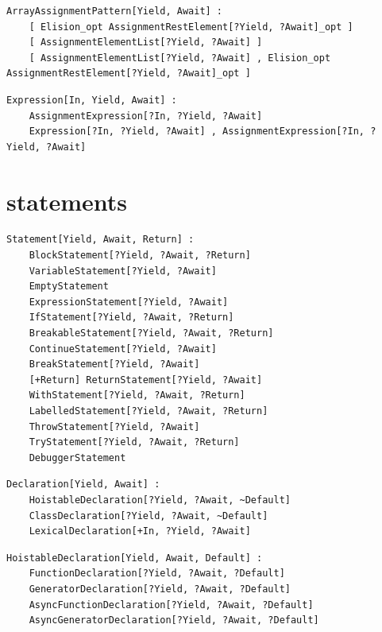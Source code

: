 \noindent\textbf{\texttt{}}\par
\begin{lstlisting}
ArrayAssignmentPattern[Yield, Await] :
    [ Elision_opt AssignmentRestElement[?Yield, ?Await]_opt ]
    [ AssignmentElementList[?Yield, ?Await] ]
    [ AssignmentElementList[?Yield, ?Await] , Elision_opt AssignmentRestElement[?Yield, ?Await]_opt ]
\end{lstlisting}

\noindent\textbf{\texttt{}}\par
\begin{lstlisting}
Expression[In, Yield, Await] :
    AssignmentExpression[?In, ?Yield, ?Await]
    Expression[?In, ?Yield, ?Await] , AssignmentExpression[?In, ?Yield, ?Await]
\end{lstlisting}

\section{statements}

\noindent\textbf{\texttt{}}\par
\begin{lstlisting}
Statement[Yield, Await, Return] :
    BlockStatement[?Yield, ?Await, ?Return]
    VariableStatement[?Yield, ?Await]
    EmptyStatement
    ExpressionStatement[?Yield, ?Await]
    IfStatement[?Yield, ?Await, ?Return]
    BreakableStatement[?Yield, ?Await, ?Return]
    ContinueStatement[?Yield, ?Await]
    BreakStatement[?Yield, ?Await]
    [+Return] ReturnStatement[?Yield, ?Await]
    WithStatement[?Yield, ?Await, ?Return]
    LabelledStatement[?Yield, ?Await, ?Return]
    ThrowStatement[?Yield, ?Await]
    TryStatement[?Yield, ?Await, ?Return]
    DebuggerStatement
\end{lstlisting}

\noindent\textbf{\texttt{}}\par
\begin{lstlisting}
Declaration[Yield, Await] :
    HoistableDeclaration[?Yield, ?Await, ~Default]
    ClassDeclaration[?Yield, ?Await, ~Default]
    LexicalDeclaration[+In, ?Yield, ?Await]
\end{lstlisting}

\noindent\textbf{\texttt{}}\par
\begin{lstlisting}
HoistableDeclaration[Yield, Await, Default] :
    FunctionDeclaration[?Yield, ?Await, ?Default]
    GeneratorDeclaration[?Yield, ?Await, ?Default]
    AsyncFunctionDeclaration[?Yield, ?Await, ?Default]
    AsyncGeneratorDeclaration[?Yield, ?Await, ?Default]
\end{lstlisting}

